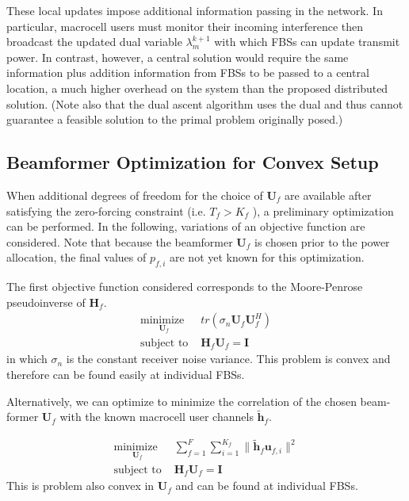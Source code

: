 These local updates impose additional information passing in the network. In particular, macrocell users must monitor their incoming interference then broadcast the updated dual variable $\lambda_{m}^{k+1}$ with which FBSs can update  transmit power. In contrast, however, a central solution would require the same information plus addition information from FBSs to be passed to a central location, a much higher overhead on the system than the proposed distributed solution. 
(Note also that the dual ascent algorithm uses the dual and thus cannot guarantee a feasible solution to the primal problem originally posed.)

\subsection{Beamformer Optimization for Convex Setup}\label{beamformer_optimization}
When additional degrees of freedom for the choice of $\mathbf{U}_{f}$ are available after satisfying the zero-forcing constraint (i.e. $T_{f}> K_{f}$ ), a preliminary optimization can be performed. In the following, variations of an objective function are considered. Note that because the beamformer $\mathbf{U}_{f}$ is chosen prior to the power allocation, the final values of $p_{f,i}$ are not yet known for this optimization. 
\par
The first objective function considered corresponds to the Moore-Penrose pseudoinverse of $\mathbf{H}_{f}$. 
    \begin{equation}
    \begin{array}{ll}
    \underset{\mathbf{U}_{f} }{\text{minimize }}   & tr(\sigma_n\mathbf{U}_{f}  \mathbf{U}_{f}^H)
    \\
    \mbox{subject to } & \mathbf{H}_{f}  \mathbf{U}_{f} = \mathbf{I}
    \end{array}
    \label{mp_opt}
    \end{equation}
    in which $\sigma_n$ is the constant receiver noise variance.
    This problem is convex and therefore can be found easily at individual FBSs. 

    \par
Alternatively, we can optimize to minimize the correlation of the chosen beam-former $\mathbf{U}_{f}$ with the known macrocell user channels $\tilde{\mathbf{h}}_{f}$.

    \begin{equation}
    \begin{array}{ll}
    \underset{\mathbf{U}_{f} }{\text{minimize }}   & \sum^F_{f=1} \sum^{K_f}_{i=1}\|\tilde{\mathbf{h}}_{f}  \mathbf{u}_{f,i}\|^2
    \\
    \mbox{subject to } & \mathbf{H}_{f} \mathbf{U}_{f} = \mathbf{I}
    \end{array}
    \label{correlation_opt}
    \end{equation}
This is problem also convex in $\mathbf{U}_{f}$ and can be found at individual FBSs.

